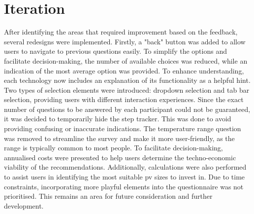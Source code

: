 \section{Iteration}

After identifying the areas that required improvement based on the feedback, several redesigns were implemented.
Firstly, a "back" button was added to allow users to navigate to previous questions easily.
To simplify the options and facilitate decision-making, the number of available choices was reduced, while an indication of the most average option was provided.
To enhance understanding, each technology now includes an explanation of its functionality as a helpful hint.
Two types of selection elements were introduced: dropdown selection and tab bar selection, providing users with different interaction experiences.
Since the exact number of questions to be answered by each participant could not be guaranteed, it was decided to temporarily hide the step tracker. 
This was done to avoid providing confusing or inaccurate indications.
The temperature range question was removed to streamline the survey and make it more user-friendly, as the range is typically common to most people.
To facilitate decision-making, annualised costs were presented to help users determine the techno-economic viability of the recommendations. 
Additionally, calculations were also performed to assist users in identifying the most suitable \gls{pv} sizes to invest in.
Due to time constraints, incorporating more playful elements into the questionnaire was not prioritised. 
This remains an area for future consideration and further development. 